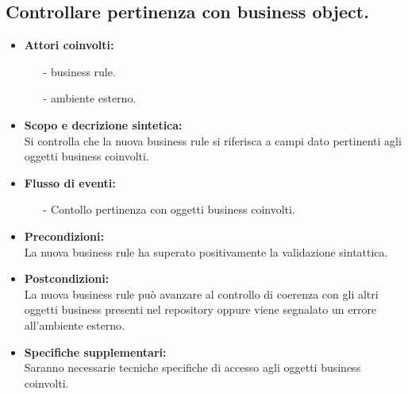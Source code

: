\documentclass[11pt,titlepage,a4paper]{report}
\begin{document}
\subsection{Controllare pertinenza con business object.}
\begin{itemize}
\item{\textbf{Attori coinvolti:}}
\begin{itemize}
\item[-] business rule.
\item[-] ambiente esterno.
\end{itemize}
\item{\textbf{Scopo e decrizione sintetica:}}\\
Si controlla che la nuova business rule si riferisca a campi dato pertinenti agli oggetti business coinvolti.
\item{\textbf{Flusso di eventi:}}
\begin{itemize}
 \item[-] Contollo pertinenza con oggetti business coinvolti.
\end{itemize}
\item{\textbf{Precondizioni:}}\\
La nuova business rule ha superato positivamente la validazione sintattica.
\item{\textbf{Postcondizioni:}}\\
La nuova business rule pu\`o avanzare al controllo di coerenza con gli altri oggetti business presenti nel repository oppure viene segnalato un errore all'ambiente esterno.
\item\textbf{{Specifiche supplementari:}}\\
Saranno necessarie tecniche specifiche di accesso agli oggetti business coinvolti.
\end{itemize}
\end{document}
